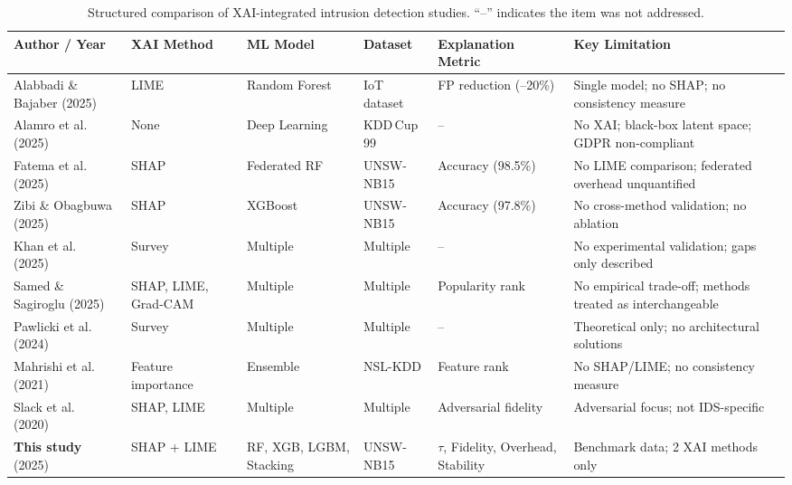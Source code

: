 \documentclass[conference]{IEEEtran}
\begin{document}
\begin{table}[htbp]
\centering
\caption{Structured comparison of XAI-integrated intrusion detection studies. ``--'' indicates the item was not addressed.}
\label{tab:related}
\renewcommand{\arraystretch}{1.15}
\begin{tabular}{>{\raggedright}p{2.6cm}
                >{\centering}p{1.8cm}
                >{\centering}p{2.0cm}
                >{\centering}p{2.0cm}
                >{\centering}p{2.2cm}
                >{\raggedright\arraybackslash}p{3.2cm}}
\toprule
\textbf{Author / Year} & \textbf{XAI Method} & \textbf{ML Model} & \textbf{Dataset} & \textbf{Explanation Metric} & \textbf{Key Limitation} \\
\midrule
Alabbadi \& Bajaber \cite{alabbadi2025} (2025)
  & LIME & Random Forest & IoT dataset & FP reduction (--20\%) & Single model; no SHAP; no consistency measure \\
Alamro et al.\ \cite{alamro2025} (2025)
  & None & Deep Learning & KDD\,Cup\,99 & -- & No XAI; black-box latent space; GDPR non-compliant \\
Fatema et al.\ \cite{fatema2025} (2025)
  & SHAP & Federated RF & UNSW-NB15 & Accuracy (98.5\%) & No LIME comparison; federated overhead unquantified \\
Zibi \& Obagbuwa \cite{zibi2025b} (2025)
  & SHAP & XGBoost & UNSW-NB15 & Accuracy (97.8\%) & No cross-method validation; no ablation \\
Khan et al.\ \cite{khan2025} (2025)
  & Survey & Multiple & Multiple & -- & No experimental validation; gaps only described \\
Samed \& Sagiroglu \cite{samed2025} (2025)
  & SHAP, LIME, Grad-CAM & Multiple & Multiple & Popularity rank & No empirical trade-off; methods treated as interchangeable \\
Pawlicki et al.\ \cite{pawlicki2024} (2024)
  & Survey & Multiple & Multiple & -- & Theoretical only; no architectural solutions \\
Mahrishi et al.\ \cite{mahrishi2021} (2021)
  & Feature importance & Ensemble & NSL-KDD & Feature rank & No SHAP/LIME; no consistency measure \\
Slack et al.\ \cite{slack2020} (2020)
  & SHAP, LIME & Multiple & Multiple & Adversarial fidelity & Adversarial focus; not IDS-specific \\
\textbf{This study} (2025)
  & SHAP + LIME & RF, XGB, LGBM, Stacking & UNSW-NB15 & $\tau$, Fidelity, Overhead, Stability & Benchmark data; 2 XAI methods only \\
\bottomrule
\end{tabular}
\end{table}
\end{document}

